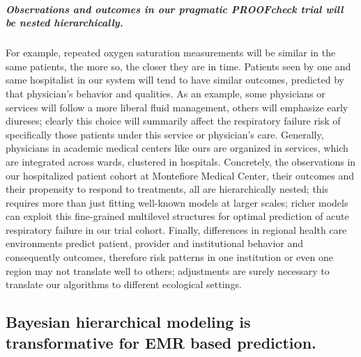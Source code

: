 \documentclass[11pt,notitlepage]{article}
\begin{document}
\subparagraph{Observations and outcomes in our pragmatic PROOFcheck trial will be nested hierarchically.}
For example, repeated oxygen saturation measurements will be similar in the same patients, the more so, the closer they are in time. Patients seen by one and same hospitalist in our system will tend to have similar outcomes, predicted by that physician's behavior and qualities. As an example, some physicians or services will follow a more liberal fluid management, others will emphasize early diureses; clearly this choice will summarily affect the respiratory failure risk of specifically those patients under this service or physician's care. Generally, physicians in academic medical centers like ours are organized in services, which are integrated across wards, clustered in hospitals. Concretely, the observations in our hospitalized patient cohort at Montefiore Medical Center, their outcomes and their propensity to respond to treatments, all are hierarchically nested; this requires more than just fitting well-known models at larger scales; richer models can exploit this fine-grained multilevel structures for optimal prediction of acute respiratory failure in our trial cohort. Finally, differences in regional health care environments predict patient, provider and institutional behavior and consequently outcomes, therefore risk patterns in one institution or even one region may not translate well to others; adjustments are surely necessary to translate our algorithms to different ecological settings. 

\subsection*{Bayesian hierarchical modeling is transformative for EMR based prediction.}
\end{document}
